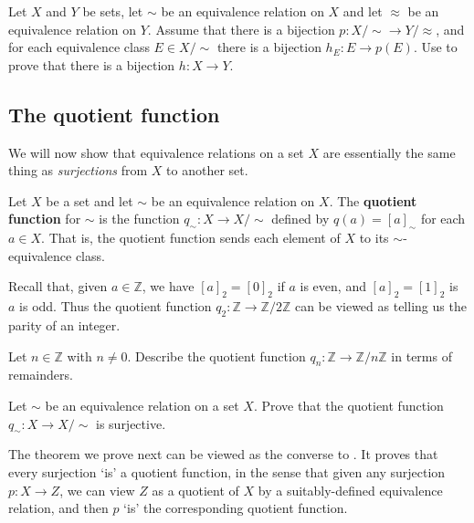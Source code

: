 \begin{exercise}
\label{exBijectionOfQuotientsAndClassesInducesBijectionOfSets}
Let $X$ and $Y$ be sets, let $\sim$ be an equivalence relation on $X$ and let $\approx$ be an equivalence relation on $Y$. Assume that there is a bijection $p : X/{\sim} \to Y/{\approx}$, and for each equivalence class $E \in X/{\sim}$ there is a bijection $h_E : E \to p(E)$. Use  to prove that there is a bijection $h : X \to Y$.
\end{exercise}

\subsection*{The quotient function}

We will now show that equivalence relations on a set $X$ are essentially the same thing as \textit{surjections} from $X$ to another set.

\begin{definition}
\label{defQuotientFunction}
Let $X$ be a set and let $\sim$ be an equivalence relation on $X$. The \textbf{quotient function} for $\sim$ is the function $q_{\sim} : X \to X/{\sim}$ defined by $q(a) = [a]_{\sim}$ for each $a \in X$. That is, the quotient function sends each element of $X$ to its $\sim$-equivalence class.
\end{definition}

\begin{example}
Recall that, given $a \in \mathbb{Z}$, we have $[a]_2 = [0]_2$ if $a$ is even, and $[a]_2 = [1]_2$ is $a$ is odd. Thus the quotient function $q_2 : \mathbb{Z} \to \mathbb{Z}/2\mathbb{Z}$ can be viewed as telling us the parity of an integer.
\end{example}

\begin{exercise}
Let $n \in \mathbb{Z}$ with $n \ne 0$. Describe the quotient function $q_n : \mathbb{Z} \to \mathbb{Z}/n\mathbb{Z}$ in terms of remainders.
\end{exercise}

\begin{exercise}
\label{exQuotientFunctionIsSurjective}
Let $\sim$ be an equivalence relation on a set $X$. Prove that the quotient function $q_{\sim} : X \to X/{\sim}$ is surjective.
\end{exercise}

The theorem we prove next can be viewed as the converse to . It proves that every surjection `is' a quotient function, in the sense that given any surjection $p : X \to Z$, we can view $Z$ as a quotient of $X$ by a suitably-defined equivalence relation, and then $p$ `is' the corresponding quotient function.

